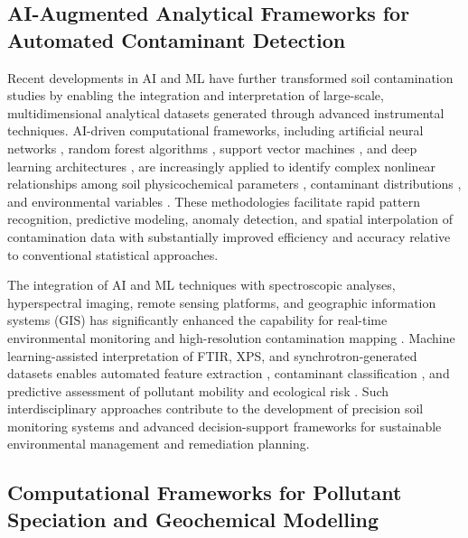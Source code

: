 \documentclass[sn-mathphys-num]{sn-jnl}
\begin{document}
\subsection{AI-Augmented Analytical Frameworks for Automated Contaminant
    Detection}\label{sec3.2}

Recent developments in AI and ML have further transformed soil contamination
studies by enabling the integration and interpretation of large-scale,
multidimensional analytical datasets generated through advanced instrumental
techniques. AI-driven computational frameworks, including artificial neural
networks \cite{Aljanabi2025,Anifowose2024}, random forest algorithms
\cite{Shaheen2018,Foronda2023}, support vector machines
\cite{Agyeman2022,Gholizadeh2020}, and deep learning architectures
\cite{Hu2024,MLReview2024}, are increasingly applied to identify complex
nonlinear relationships among soil physicochemical parameters
\cite{Aljanabi2025,Kammerlander2025}, contaminant distributions
\cite{Agyeman2022,Shaheen2018}, and environmental variables
\cite{Anifowose2024,Gholizadeh2020}. These methodologies facilitate rapid
pattern recognition, predictive modeling, anomaly detection, and spatial
interpolation of contamination data with substantially improved efficiency and
accuracy relative to conventional statistical approaches.

The integration of AI and ML techniques with spectroscopic analyses,
hyperspectral imaging, remote sensing platforms, and geographic information
systems (GIS) has significantly enhanced the capability for real-time
environmental monitoring and high-resolution contamination mapping
\cite{Gholizadeh2020,Hu2024,Lemenkova2025f}. Machine learning-assisted
interpretation of FTIR, XPS, and synchrotron-generated datasets enables
automated feature extraction \cite{Zhou2023,Caporaso2018}, contaminant
classification \cite{Agyeman2022,Hu2024}, and predictive assessment of
pollutant mobility and ecological risk
\cite{Shaheen2018,Anifowose2024,Foronda2023,Gholizadeh2020}. Such
interdisciplinary approaches contribute to the development of precision soil
monitoring systems and advanced decision-support frameworks for sustainable
environmental management and remediation planning.

\subsection{Computational Frameworks for Pollutant Speciation and
    Geochemical Modelling}\label{sec3.3}
\end{document}
